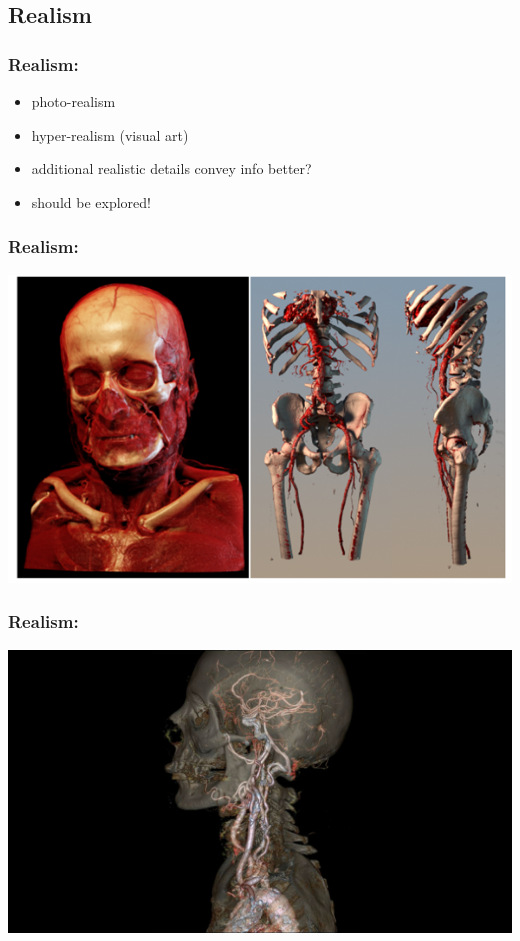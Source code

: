 \documentclass{beamer}
\begin{document}
\subsection{Realism}
\begin{frame}
	\frametitle{Realism:}
	\begin{itemize}
		\item photo-realism
		\item hyper-realism (visual art)
		\item additional realistic details convey info better?
		\item should be explored!
	\end{itemize}
\end{frame}

\begin{frame}
	\frametitle{Realism:}
	\includegraphics[width=\textwidth]{images/medical_visualisation}
\end{frame}

\begin{frame}
	\frametitle{Realism:}
	\includegraphics[width=\textwidth]{images/realistic_transparent}
\end{frame}
\end{document}
